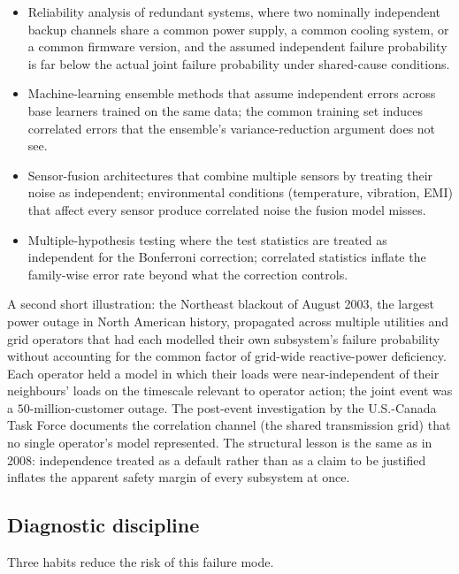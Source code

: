 \begin{itemize}[leftmargin=*]
  \item Reliability analysis of redundant systems, where two
    nominally independent backup channels share a common power
    supply, a common cooling system, or a common firmware version,
    and the assumed independent failure probability is far below
    the actual joint failure probability under shared-cause
    conditions.
  \item Machine-learning ensemble methods that assume independent
    errors across base learners trained on the same data; the
    common training set induces correlated errors that the
    ensemble's variance-reduction argument does not see.
  \item Sensor-fusion architectures that combine multiple sensors
    by treating their noise as independent; environmental
    conditions (temperature, vibration, EMI) that affect every
    sensor produce correlated noise the fusion model misses.
  \item Multiple-hypothesis testing where the test statistics are
    treated as independent for the Bonferroni correction; correlated
    statistics inflate the family-wise error rate beyond what the
    correction controls.
\end{itemize}

A second short illustration: the Northeast blackout of August 2003,
the largest power outage in North American history, propagated
across multiple utilities and grid operators that had each modelled
their own subsystem's failure probability without accounting for the
common factor of grid-wide reactive-power deficiency. Each operator
held a model in which their loads were near-independent of their
neighbours' loads on the timescale relevant to operator action; the
joint event was a $50$-million-customer outage. The post-event
investigation by the U.S.-Canada Task Force documents the
correlation channel (the shared transmission grid) that no single
operator's model represented. The structural lesson is the same as
in 2008: independence treated as a default rather than as a claim
to be justified inflates the apparent safety margin of every
subsystem at once.

\subsection{Diagnostic discipline}

Three habits reduce the risk of this failure mode.

